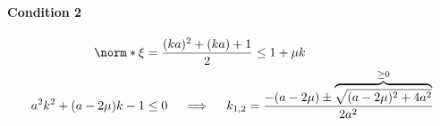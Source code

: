 \paragraph{Condition 2}
\begin{align*}
  \norm*{\xi}                & = \frac{(ka)^2 + (ka) + 1}{2} \leq 1 + \mu k                                                                       \\
  a^2 k^2 + (a - 2\mu) k - 1 & \leq 0 \quad \implies \quad k_{1,2} = \frac{-(a - 2\mu) \pm \overbrace{\sqrt{(a - 2\mu)^2 + 4a^2}}^{\geq 0}}{2a^2} \\
\end{align*}